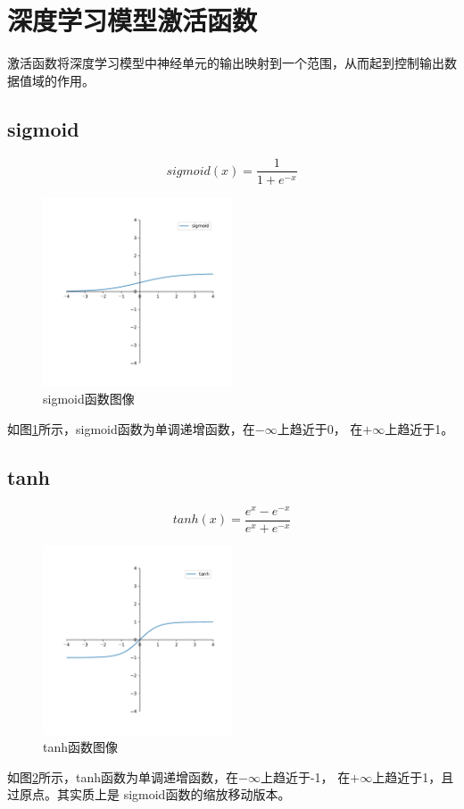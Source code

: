 \documentclass[AutoFakeBold]{LZUThesis}
\begin{document}
\section{深度学习模型激活函数}
激活函数将深度学习模型中神经单元的输出映射到一个范围，从而起到控制输出数据值域的作用。
\subsection{sigmoid}
$$sigmoid(x)=\frac{1}{1+e^{-x}}$$
\begin{figure}[H]
	\centering
    \includegraphics[width=0.5\textwidth]{figures/sigmoid.pdf}
    \caption{sigmoid函数图像}
    \label{fig_sigmoid}
\end{figure}
如图\ref{fig_sigmoid}所示，sigmoid函数为单调递增函数，在$-\infty$上趋近于0，
在$+\infty$上趋近于1。

\subsection{tanh}
$$tanh(x) = \frac{e^x-e^{-x}}{e^x+e^{-x}}$$
\begin{figure}[H]
	\centering
    \includegraphics[width=0.5\textwidth]{figures/tanh.pdf}
    \caption{tanh函数图像}
    \label{fig_tanh}
\end{figure}
如图\ref{fig_tanh}所示，tanh函数为单调递增函数，在$-\infty$上趋近于-1，
在$+\infty$上趋近于1，且过原点。其实质上是
sigmoid函数的缩放移动版本。
\end{document}
